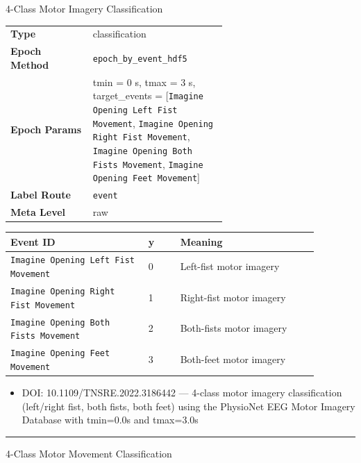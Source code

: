 {\begin{tcolorbox}
 {\footnotesize 4-Class Motor Imagery Classification}\par\smallskip
{\footnotesize\begin{tabular}{@{}lp{0.62\linewidth}@{}}
\textbf{Type} & classification \\
\textbf{Epoch Method} & \texttt{epoch\_by\_event\_hdf5} \\
\textbf{Epoch Params} & tmin = 0 s, tmax = 3 s, target\_events = [\texttt{Imagine Opening Left Fist Movement}, \texttt{Imagine Opening Right Fist Movement}, \texttt{Imagine Opening Both Fists Movement}, \texttt{Imagine Opening Feet Movement}] \\
\textbf{Label Route} & \texttt{event} \\
\textbf{Meta Level} & raw \\
\end{tabular}}
\par{}\par\smallskip
\begingroup\footnotesize
\begin{tabular}{@{}p{0.3911\linewidth}p{0.0978\linewidth}p{0.3911\linewidth}@{}}
\toprule
\textbf{Event ID} & \textbf{y} & \textbf{Meaning} \\
\midrule
\texttt{Imagine Opening Left Fist Movement} & 0 & Left-fist motor imagery \\
\texttt{Imagine Opening Right Fist Movement} & 1 & Right-fist motor imagery \\
\texttt{Imagine Opening Both Fists Movement} & 2 & Both-fists motor imagery \\
\texttt{Imagine Opening Feet Movement} & 3 & Both-feet motor imagery \\
\bottomrule
\end{tabular}
\endgroup
\par{}\par
\begin{itemize}[leftmargin=1.3em,noitemsep,topsep=1pt]
\item[\scriptsize$\cdot$] {\scriptsize DOI: 10.1109/TNSRE.2022.3186442 --- 4-class motor imagery classification (left/right fist, both fists, both feet) using the PhysioNet EEG Motor Imagery Database with tmin=0.0s and tmax=3.0s}
\end{itemize}
\noindent\rule{\linewidth}{0.4pt}\par\nopagebreak
{} {\footnotesize 4-Class Motor Movement Classification}\par\smallskip

\end{tcolorbox}}
